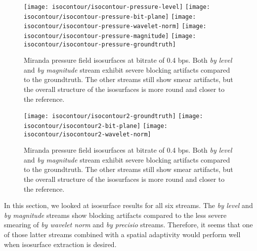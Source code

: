 \begin{figure}[h]
	\centering
	{\texttt{[image: isocontour/isocontour-pressure-level]}}
	{\texttt{[image: isocontour/isocontour-pressure-bit-plane]}}
	{\texttt{[image: isocontour/isocontour-pressure-wavelet-norm]}}
	{\texttt{[image: isocontour/isocontour-pressure-magnitude]}}
	{\texttt{[image: isocontour/isocontour-pressure-groundtruth]}}
	\caption{Miranda pressure field isosurfaces at bitrate of 0.4 bps. Both {\em by level}
        and {\em by magnitude} stream exhibit severe blocking artifacts compared to the groundtruth. The other streams
        still show smear artifacts, but the overall structure of the isosurfaces is more round and closer to the
        reference.}
	\label{fig:isocontour-surfaces}
\end{figure}

\begin{figure}[h]
	\centering
	{\texttt{[image: isocontour/isocontour2-groundtruth]}}
	{\texttt{[image: isocontour/isocontour2-bit-plane]}}
	{\texttt{[image: isocontour/isocontour2-wavelet-norm]}}
	\caption{Miranda pressure field isosurfaces at bitrate of 0.4 bps. Both {\em by level}
        and {\em by magnitude} stream exhibit severe blocking artifacts compared to the groundtruth. The other streams
        still show smear artifacts, but the overall structure of the isosurfaces is more round and closer to the
        reference.}
	\label{fig:isocontour-surfaces}
\end{figure}



In this section, we looked at isosurface results for all six streams. The {\em by level} and {\em by magnitude} streams
show blocking artifacts compared to the less severe smearing of {\em by wavelet norm} and {\em by precisio} streams. Therefore,
it seems that one of those latter streams combined with a spatial adaptivity would perform well when isosurface
extraction is desired.
